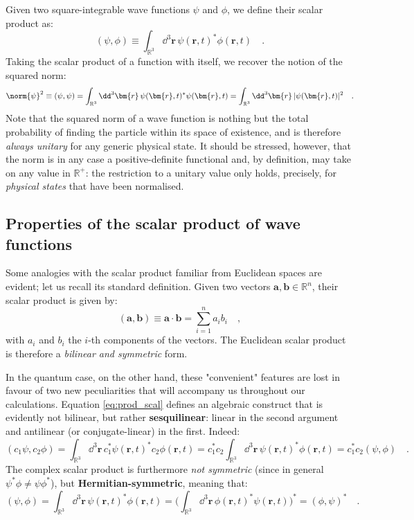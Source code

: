 Given two square-integrable wave functions $\psi$ and $\phi$, we define their scalar product as:
\begin{equation}
    (\psi, \phi) \equiv \int_{\mathbb{R}^3} \dd^3{\bm{r}}\, \psi(\bm{r},t)^*\phi(\bm{r},t) \quad.
    \label{eq:prod_scal}
\end{equation}
Taking the scalar product of a function with itself, we recover the notion of the squared norm:
\[
    \norm{\psi}^2 \equiv (\psi,\psi) = \int_{\mathbb{R}^3} \dd^3{\bm{r}}\, \psi(\bm{r},t)^*\psi(\bm{r},t) = \int_{\mathbb{R}^3}\dd^3{\bm{r}}\, |\psi(\bm{r},t)|^2 \quad.
\]
Note that the squared norm of a wave function is nothing but the total probability of finding the particle within its space of existence, and is therefore \emph{always unitary} for any generic physical state. It should be stressed, however, that the norm is in any case a positive-definite functional and, by definition, may take on any value in $\mathbb{R}^+$: the restriction to a unitary value only holds, precisely, for \emph{physical states} that have been normalised.

\subsection{Properties of the scalar product of wave functions}
Some analogies with the scalar product familiar from Euclidean spaces are evident; let us recall its standard definition.
Given two vectors $\bm{a}, \bm{b} \in \mathbb{R}^n$, their scalar product is given by:
\[
    (\bm{a}, \bm{b}) \equiv \bm{a} \cdot \bm{b} = \sum_{i = 1}^n a_ib_i \quad,
\]
with $a_i$ and $b_i$ the $i$-th components of the vectors. The Euclidean scalar product is therefore a \emph{bilinear and symmetric} form.

In the quantum case, on the other hand, these "convenient" features are lost in favour of two new peculiarities that will accompany us throughout our calculations. Equation \eqref{eq:prod_scal} defines an algebraic construct that is evidently not bilinear, but rather \textbf{sesquilinear}: linear in the second argument and antilinear (or conjugate-linear) in the first. Indeed:
\[
    (c_1\psi, c_2\phi) = \int_{\mathbb{R}^3} \dd^3{\bm{r}}\, c_1^*\psi(\bm{r},t)^*c_2\phi(\bm{r},t) = c_1^*c_2 \int_{\mathbb{R}^3} \dd^3{\bm{r}}\, \psi(\bm{r},t)^*\phi(\bm{r},t) = c_1^*c_2 (\psi, \phi) \quad.
\]
The complex scalar product is furthermore \emph{not symmetric} (since in general $\psi^*\phi \neq \psi\phi^*$), but \textbf{Hermitian-symmetric}, meaning that:
\[
    (\psi, \phi) = \int_{\mathbb{R}^3} \dd^3{\bm{r}}\, \psi(\bm{r},t)^*\phi(\bm{r},t) = \biggl( \int_{\mathbb{R}^3} \dd^3{\bm{r}}\, \phi(\bm{r},t)^*\psi(\bm{r},t) \biggr)^* = (\phi, \psi)^* \quad.
\]